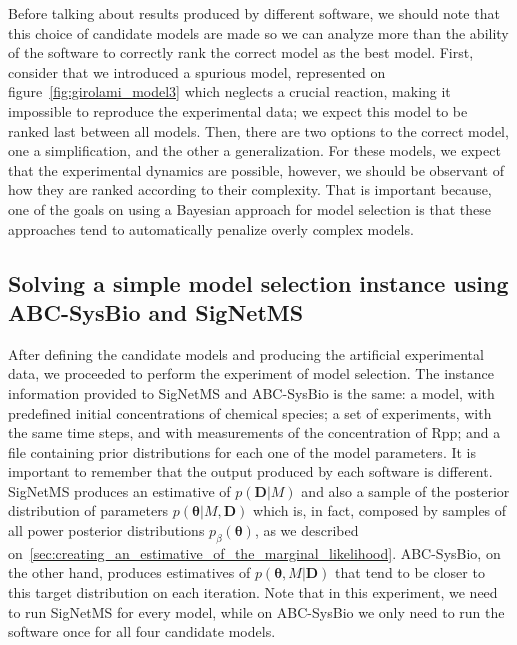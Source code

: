 
Before talking about results produced by different software, we should
note that this choice of candidate models are made so we can analyze
more than the ability of the software to correctly rank the correct
model as the best model. First, consider that we introduced a spurious
model, represented on figure~\ref{fig:girolami_model3} which neglects a
crucial reaction, making it impossible to reproduce the experimental
data; we expect this model to be ranked last between all models. Then,
there are two options to the correct model, one a simplification, and
the other a generalization. For these models, we expect that the
experimental dynamics are possible, however, we should be observant of
how they are ranked according to their complexity. That is important
because, one of the goals on using a Bayesian approach for model 
selection is that these approaches tend to automatically penalize overly
complex models.

\subsection{Solving a simple model selection instance using ABC-SysBio
and SigNetMS}

After defining the candidate models and producing the artificial
experimental data, we proceeded to perform the experiment of model
selection. The instance information provided to SigNetMS and ABC-SysBio 
is the same: a model, with predefined initial concentrations of chemical 
species; a set of experiments, with the same time steps, and with
measurements of the concentration of Rpp; and a file containing prior
distributions for each one of the model parameters. It is important to
remember that the output produced by each software is different.
SigNetMS produces an estimative of $p({\bm D} | M)$ and also a sample of
the posterior distribution of parameters $p({\bm \theta} | M, {\bm D})$
which is, in fact, composed by samples of all power posterior
distributions $p_{\beta}({\bm \theta})$, as we described
on~\ref{sec:creating_an_estimative_of_the_marginal_likelihood}.
ABC-SysBio, on the other hand, produces estimatives of $p({\bm
\theta}, M | {\bm D})$ that tend to be closer to this target 
distribution on each iteration. Note that in this experiment, we need to
run SigNetMS for every model, while on ABC-SysBio we only need to run 
the software once for all four candidate models.

